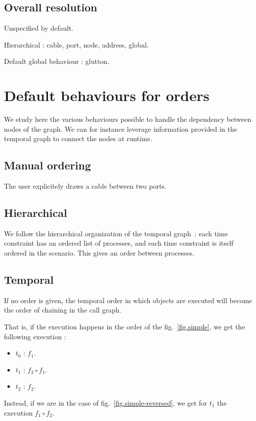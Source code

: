 \documentclass{article}
\begin{document}
    \subsection{Overall resolution}
    Unspecified by default. 
    
    Hierarchical : cable, port, node, address, global.
    
    Default global behaviour : glutton.
    
  
    \section{Default behaviours for orders}
    We study here the various behaviours possible to handle the dependency between nodes of the graph. 
    We can for instance leverage information provided in the temporal graph to connect the nodes at runtime. 
    
    \subsection{Manual ordering}
    The user explicitely draws a cable between two ports.
    
    \subsection{Hierarchical}
    We follow the hierarchical organization of the temporal graph~: each time constraint has an ordered list of processes, and each time constraint is itself ordered in the scenario. This gives an order between processes.
    
    \subsection{Temporal}
    If no order is given, the temporal order in which objects are executed
    will become the order of chaining in the call graph.
    
    That is, if the execution happens in the order of the fig.~\ref{fig.simple}, we get the following execution : 
    
    \begin{itemize}
        \item $t_0$ : $f_1$.
        \item $t_1$ : $f_2 \circ f_1$.
        \item $t_2$ : $f_2$. 
    \end{itemize}

    Instead, if we are in the case of fig.~\ref{fig.simple-reversed}, we get for $t_1$ the execution $f_1 \circ f_2$.
    
\end{document}
